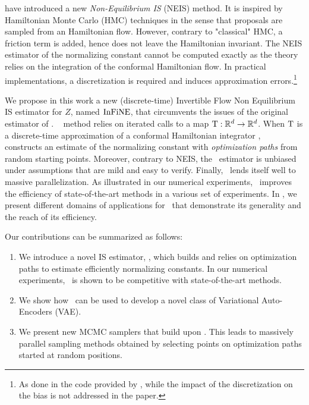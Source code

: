 \documentclass{article}
\begin{document}
\cite{rotskoff:vanden-eijden:2019} have introduced a new \emph{Non-Equilibrium IS} (NEIS) method.
It is inspired by Hamiltonian Monte Carlo (HMC) techniques in the sense that proposals are sampled from an Hamiltonian flow.
However, contrary to "classical" HMC, a friction term is added, hence does not leave the Hamiltonian invariant.
The NEIS estimator of the normalizing constant cannot be computed exactly as the theory relies on the integration of the conformal Hamiltonian flow. In practical implementations, a discretization is required and induces approximation errors.\footnote{As done in the code provided by
  \cite{rotskoff:vanden-eijden:2019}, while the impact of the  discretization on the bias is not  addressed in the paper.}

 We propose in this work  a new (discrete-time) Invertible Flow Non Equilibrium IS estimator for $Z$, named $\operatorname{InFiNE}$, that circumvents the issues of the original estimator of \cite{rotskoff:vanden-eijden:2019}. \IFIS~ method relies on  iterated calls to a map $\operatorname{T} : \mathbb{R}^{d} \to \mathbb{R}^{d}$.
When $\operatorname{T}$ is a discrete-time approximation of a conformal Hamiltonian integrator \citep{francca2019conformal}, \IFIS~ constructs an estimate of the normalizing constant with \emph {optimization paths} from random starting points.
Moreover, contrary to NEIS, the \IFIS~estimator is  unbiased under assumptions that are mild and easy to verify. Finally, \IFIS\ lends itself well to massive parallelization.
As illustrated in our numerical experiments, \IFIS\ improves the efficiency of state-of-the-art methods in a various set of experiments.
In , we present  different domains of applications for \IFIS\ that demonstrate its generality and the reach of its efficiency.

  Our contributions can be summarized as follows:
\begin{enumerate}[label=\textbf{(\roman*)}]
    \item We introduce a novel IS estimator, \IFIS, which builds and relies on optimization paths to estimate efficiently normalizing constants. In our numerical experiments, \IFIS\ is shown to be competitive with state-of-the-art methods.
    \item We show how \IFIS\ can be used to develop a novel class of Variational Auto-Encoders (VAE). %
    \item We present new MCMC samplers that build upon \IFIS. This leads to massively parallel sampling methods obtained by selecting points on optimization paths started at random positions.
\end{enumerate}
\end{document}

